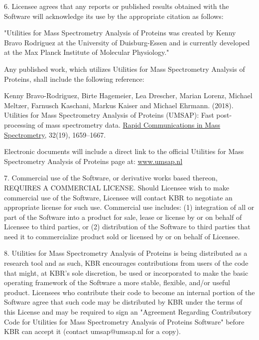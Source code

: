 \num{6}. Licensee agrees that any reports or published results obtained with the Software
will acknowledge its use by the appropriate citation as follows:

"Utilities for Mass Spectrometry Analysis of Proteins was created by Kenny Bravo
Rodriguez at the University of Duisburg-Essen and is currently developed at the
Max Planck Institute of Molecular Physiology."

Any published work, which utilizes Utilities for Mass Spectrometry Analysis of Proteins,
shall include the following reference:

Kenny Bravo-Rodriguez, Birte Hagemeier, Lea Drescher, Marian Lorenz, Michael Meltzer,
Farnusch Kaschani, Markus Kaiser and Michael Ehrmann. (\num{2018}). Utilities for
Mass Spectrometry Analysis of Proteins (UMSAP): Fast post-processing of mass spectrometry
data. \href{https://onlinelibrary.wiley.com/doi/10.1002/rcm.8243}{Rapid Communications
in Mass Spectrometry}, \num{32}(\num{19}), \numrange[range-phrase = --]{1659}{1667}.

Electronic documents will include a direct link to the official Utilities for Mass
Spectrometry Analysis of Proteins page at:
\href{https://www.umsap.nl/}{www.umsap.nl}

\num{7}. Commercial use of the Software, or derivative works based thereon, REQUIRES
A COMMERCIAL LICENSE.  Should Licensee wish to make commercial use of the Software,
Licensee will contact KBR to negotiate an appropriate license for such use. Commercial
use includes:
(\num{1}) integration of all or part of the Software into a product for sale, lease
or license by or on behalf of Licensee to third parties, or
(\num{2}) distribution of the Software to third parties that need it to commercialize
product sold or licensed by or on behalf of Licensee.

\num{8}. Utilities for Mass Spectrometry Analysis of Proteins is being distributed
as a research tool and as such, KBR encourages contributions from users of the code
that might, at KBR's sole discretion, be used or incorporated to make the basic
operating framework of the Software a more stable, flexible, and/or useful product.
Licensees who contribute their code to become an internal portion of the Software
agree that such code may be distributed by KBR under the terms of this License and
may be required to sign an "Agreement Regarding Contributory Code for Utilities for
Mass Spectrometry Analysis of Proteins Software" before KBR can accept it (contact
umsap@umsap.nl for a copy).

